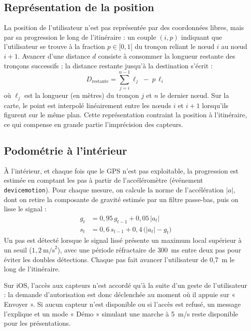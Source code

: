 \documentclass[12pt,a4paper]{report}
\begin{document}
\subsection{Représentation de la position}

La position de l'utilisateur n'est pas représentée par des coordonnées libres, mais par sa
progression le long de l'itinéraire : un couple $(i, p)$ indiquant que l'utilisateur se trouve à la
fraction $p \in [0, 1[$ du tronçon reliant le nœud $i$ au nœud $i+1$. Avancer d'une distance $d$
consiste à consommer la longueur restante des tronçons successifs ; la distance restante jusqu'à
la destination s'écrit :
\begin{equation}
D_{\text{restante}} = \sum_{j=i}^{n-1} \ell_j \; - \; p\,\ell_i
\end{equation}
où $\ell_j$ est la longueur (en mètres) du tronçon $j$ et $n$ le dernier nœud. Sur la carte, le
point est interpolé linéairement entre les nœuds $i$ et $i+1$ lorsqu'ils figurent sur le même
plan. Cette représentation contraint la position à l'itinéraire, ce qui compense en grande partie
l'imprécision des capteurs.

\subsection{Podométrie à l'intérieur}

À l'intérieur, et chaque fois que le GPS n'est pas exploitable, la progression est estimée en
comptant les pas à partir de l'accéléromètre (événement \texttt{devicemotion}). Pour chaque
mesure, on calcule la norme de l'accélération $|a|$, dont on retire la composante de gravité
estimée par un filtre passe-bas, puis on lisse le signal :
\begin{align}
g_t &= 0{,}95\, g_{t-1} + 0{,}05\, |a_t| \\
s_t &= 0{,}6\, s_{t-1} + 0{,}4\, \big(|a_t| - g_t\big)
\end{align}
Un pas est détecté lorsque le signal lissé présente un maximum local supérieur à un seuil
($1{,}2~\text{m/s}^2$), avec une période réfractaire de 300~ms entre deux pas pour éviter les
doubles détections. Chaque pas fait avancer l'utilisateur de 0{,}7~m le long de l'itinéraire.

Sur iOS, l'accès aux capteurs n'est accordé qu'à la suite d'un geste de l'utilisateur : la
demande d'autorisation est donc déclenchée au moment où il appuie sur « Envoyer ». Si aucun
capteur n'est disponible ou si l'accès est refusé, un message l'explique et un mode
« Démo » simulant une marche à 5~m/s reste disponible pour les présentations.
\end{document}
